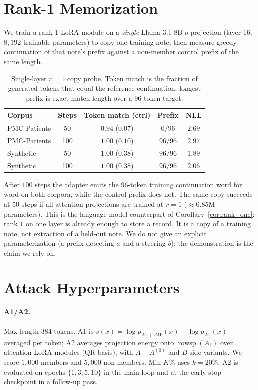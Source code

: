 \documentclass[11pt]{article}
\newcommand{\Wz}{W_0}
\newcommand{\dW}{\Delta W}
\newcommand{\rowsp}{\operatorname{rowsp}}
\theoremstyle{plain}
\theoremstyle{definition}
\begin{document}
\section{Rank-1 Memorization}\label{app:rank1}

We train a rank-1 LoRA module on a \emph{single} Llama-3.1-8B
$o$-projection (layer 16; $8{,}192$ trainable parameters) to copy one
training note, then measure greedy continuation of that note's prefix
against a non-member control prefix of the same length.

\begin{table}[h]
\centering\small
\caption{Single-layer $r{=}1$ copy probe. Token match is the fraction of
generated tokens that equal the reference continuation; longest prefix
is exact match length over a 96-token target.}
\label{tab:memorize}
\begin{tabular}{lcccc}
\toprule
Corpus & Steps & Token match (ctrl) & Prefix & NLL \\
\midrule
PMC-Patients & 50 & $0.94$ ($0.07$) & $0/96$ & $2.69$ \\
PMC-Patients & 100 & $1.00$ ($0.10$) & $96/96$ & $2.97$ \\
Synthetic & 50 & $1.00$ ($0.38$) & $96/96$ & $1.89$ \\
Synthetic & 100 & $1.00$ ($0.38$) & $96/96$ & $2.06$ \\
\bottomrule
\end{tabular}
\end{table}

After $100$ steps the adapter emits the 96-token training continuation word for word on both corpora, while the control prefix does not.
The same copy succeeds at $50$ steps if all attention projections are trained at $r{=}1$ ($\approx$0.85M parameters).
This is the language-model counterpart of Corollary~\ref{cor:rank_one}: rank $1$ on one layer is already enough to store a record.
It is a copy of a training note, not extraction of a held-out note.
We do not give an explicit parameterization (a prefix-detecting $a$ and a steering $b$); the demonstration is the claim we rely on.

\section{Attack Hyperparameters}\label{app:attack}

\paragraph{A1/A2.}
Max length $384$ tokens. A1 is
$s(x)=\log p_{\Wz+\dW}(x)-\log p_{\Wz}(x)$ averaged per token; A2
averages projection energy onto $\rowsp(A_\ell)$ over attention LoRA
modules (QR basis), with $A{-}A^{(0)}$ and $B$-side variants. We score
$1{,}000$ members and $5{,}000$ non-members. Min-$K$\% uses $k{=}20\%$.
A2 is evaluated on epochs $\{1,3,5,10\}$ in the main loop and at the
early-stop checkpoint in a follow-up pass.
\end{document}
